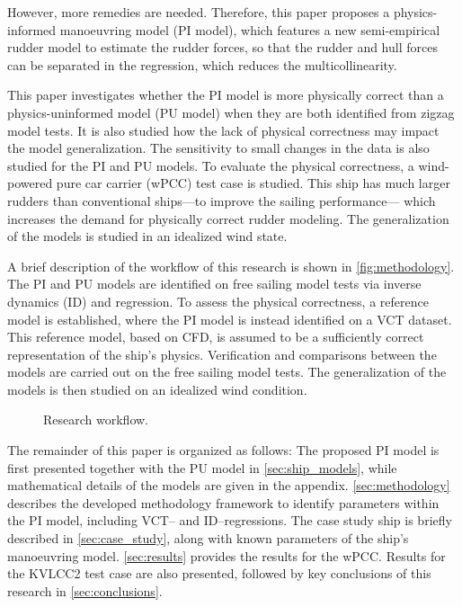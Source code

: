 However, more remedies are needed. Therefore, this paper proposes a physics-informed manoeuvring model (PI model), which features a new semi-empirical rudder model to estimate the rudder forces, so that the rudder and hull forces can be separated in the regression, which reduces the multicollinearity.

This paper investigates whether the PI model is more physically correct than a physics-uninformed model (PU model) when they are both identified from zigzag model tests. It is also studied how the lack of physical correctness may impact the model generalization. The sensitivity to small changes in the data is also studied for the PI and PU models.
To evaluate the physical correctness, a wind-powered pure car carrier (wPCC) test case is studied. 
This ship has much larger rudders than conventional ships---to improve the sailing performance---
which increases the demand for physically correct rudder modeling. The generalization of the models is studied in an idealized wind state.

A brief description of the workflow of this research is shown in \autoref{fig:methodology}.
The PI and PU models are identified on free sailing model tests \citep{alexandersson_system_2022,alexandersson_wpcc_2024} via inverse dynamics (ID) \citep{faber_inverse_2018} and regression. To assess the physical correctness, a reference model is established, where the PI model is instead identified on a VCT dataset. This reference model, based on CFD, is assumed to be a sufficiently correct representation of the ship's physics.
Verification and comparisons between the models are carried out on the free sailing model tests. The generalization of the models is then studied on an idealized wind condition.
%
\begin{figure}[h]
  \centering
  
  \caption{Research workflow.}
  \label{fig:methodology}
\end{figure}

The remainder of this paper is organized as follows: The proposed PI model is first presented together with the PU 
 model in \autoref{sec:ship_models}, while mathematical details of the models are given in the appendix. 
\autoref{sec:methodology} describes the developed methodology framework to identify parameters within the PI model, including VCT-- and ID--regressions. The case study ship is briefly described in \autoref{sec:case_study}, along with known parameters of the ship’s manoeuvring model. \autoref{sec:results} provides the results for the wPCC. Results for the KVLCC2 test case are also presented, followed by key conclusions of this research in \autoref{sec:conclusions}.